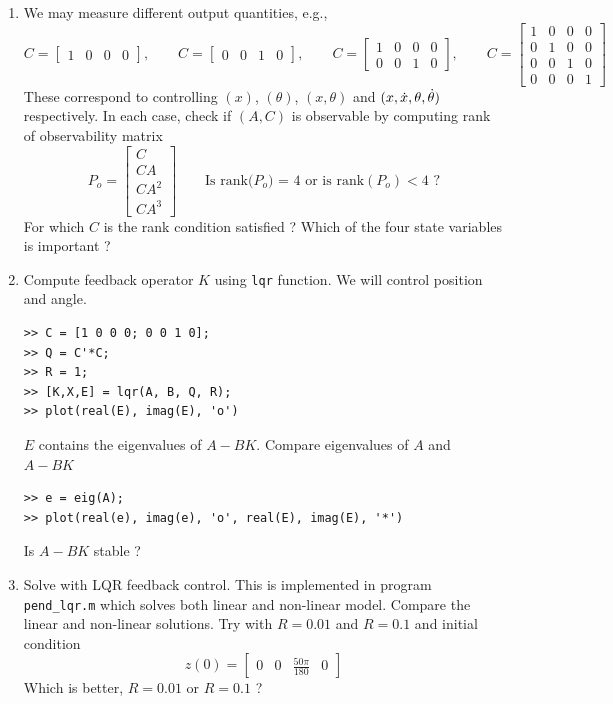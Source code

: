 \documentclass[12pt]{article}
\begin{document}
\begin{enumerate}

\item We may measure different output quantities, e.g.,
\[
C = \begin{bmatrix}
1 & 0 & 0 & 0 
\end{bmatrix}, \qquad C = \begin{bmatrix}
0 & 0 & 1 & 0
\end{bmatrix}, \qquad C = \begin{bmatrix}
1 & 0 & 0 & 0 \\
0 & 0 & 1 & 0
\end{bmatrix}, \qquad C = \begin{bmatrix}
1 & 0 & 0 & 0 \\
0 & 1 & 0 & 0 \\
0 & 0 & 1 & 0 \\
0 & 0 & 0 & 1
\end{bmatrix}
\]
These correspond to controlling $(x)$, $(\theta)$, $(x,\theta)$ and $(x,\dot{x},\theta,\dot{\theta})$ respectively. In each case, check if $(A,C)$ is observable by computing rank of observability matrix
\[
P_o = \begin{bmatrix}
C \\
CA \\
CA^2 \\
CA^3
\end{bmatrix} \qquad \mbox{Is rank($P_o$) = 4 or is rank$(P_o) < 4$ ?}
\]
For which $C$ is the rank condition satisfied ? Which of the four state variables is important ?

\item Compute feedback operator $K$ using {\tt lqr} function. We will control position and angle.
\begin{lstlisting}
>> C = [1 0 0 0; 0 0 1 0];
>> Q = C'*C;
>> R = 1;
>> [K,X,E] = lqr(A, B, Q, R);
>> plot(real(E), imag(E), 'o')
\end{lstlisting}
$E$ contains the eigenvalues of $A - B K$. Compare eigenvalues of $A$ and $A-BK$
\begin{lstlisting}
>> e = eig(A);
>> plot(real(e), imag(e), 'o', real(E), imag(E), '*')
\end{lstlisting}
Is $A-BK$ stable ?

\item Solve with LQR feedback control. This is implemented in program {\tt pend\_lqr.m} which solves both linear and non-linear model. Compare the linear and non-linear solutions. Try with $R=0.01$ and $R=0.1$ and initial condition
\[
z(0) = \begin{bmatrix}
0 & 0 & \frac{50 \pi}{180} & 0 
\end{bmatrix}
\]
Which is better, $R=0.01$ or $R=0.1$ ?


\end{enumerate}
\end{document}
